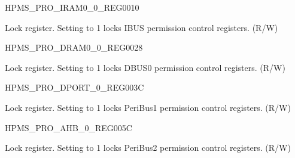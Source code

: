 \begin{register}{H}{PMS\_PRO\_IRAM0\_0\_REG}{\hexprefix{}0010}\label{regdesc:PMSPROIRAM00REG}
%
%
\regnewline%
\begin{regdesc}\begin{reglist}
\label{fielddesc:PMSPROIRAM0LOCK}\item [PMS\_PRO\_IRAM0\_LOCK] Lock register. Setting to 1 locks IBUS permission control registers. (R/W)
\end{reglist}\end{regdesc}
\end{register}


\begin{register}{H}{PMS\_PRO\_DRAM0\_0\_REG}{\hexprefix{}0028}\label{regdesc:PMSPRODRAM00REG}
%
%
\regnewline%
\begin{regdesc}\begin{reglist}
\label{fielddesc:PMSPRODRAM0LOCK}\item [PMS\_PRO\_DRAM0\_LOCK] Lock register. Setting to 1 locks DBUS0 permission control registers. (R/W)
\end{reglist}\end{regdesc}
\end{register}


\begin{register}{H}{PMS\_PRO\_DPORT\_0\_REG}{\hexprefix{}003C}\label{regdesc:PMSPRODPORT0REG}
%
%
\regnewline%
\begin{regdesc}\begin{reglist}
\label{fielddesc:PMSPRODPORTLOCK}\item [PMS\_PRO\_DPORT\_LOCK] Lock register. Setting to 1 locks PeriBus1 permission control registers. (R/W)
\end{reglist}\end{regdesc}
\end{register}


\begin{register}{H}{PMS\_PRO\_AHB\_0\_REG}{\hexprefix{}005C}\label{regdesc:PMSPROAHB0REG}
%
%
\regnewline%
\begin{regdesc}\begin{reglist}
\label{fielddesc:PMSPROAHBLOCK}\item [PMS\_PRO\_AHB\_LOCK] Lock register. Setting to 1 locks PeriBus2 permission control registers. (R/W)
\end{reglist}\end{regdesc}
\end{register}


